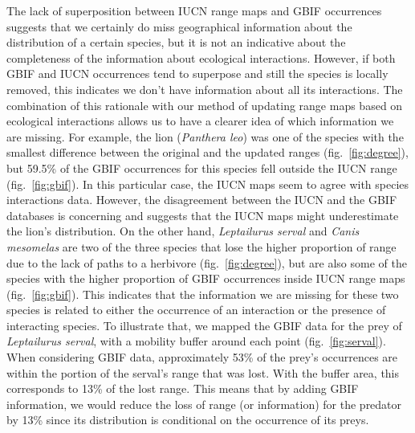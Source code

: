 \documentclass[10pt,oneside]{article}
\begin{document}
The lack of superposition between IUCN range maps and GBIF occurrences
suggests that we certainly do miss geographical information about the
distribution of a certain species, but it is not an indicative about the
completeness of the information about ecological interactions. However,
if both GBIF and IUCN occurrences tend to superpose and still the
species is locally removed, this indicates we don't have information
about all its interactions. The combination of this rationale with our
method of updating range maps based on ecological interactions allows us
to have a clearer idea of which information we are missing. For example,
the lion (\emph{Panthera leo}) was one of the species with the smallest
difference between the original and the updated ranges
(fig.~\ref{fig:degree}), but 59.5\% of the GBIF occurrences for this
species fell outside the IUCN range (fig.~\ref{fig:gbif}). In this
particular case, the IUCN maps seem to agree with species interactions
data. However, the disagreement between the IUCN and the GBIF databases
is concerning and suggests that the IUCN maps might underestimate the
lion's distribution. On the other hand, \emph{Leptailurus serval} and
\emph{Canis mesomelas} are two of the three species that lose the higher
proportion of range due to the lack of paths to a herbivore
(fig.~\ref{fig:degree}), but are also some of the species with the
higher proportion of GBIF occurrences inside IUCN range maps
(fig.~\ref{fig:gbif}). This indicates that the information we are
missing for these two species is related to either the occurrence of an
interaction or the presence of interacting species. To illustrate that,
we mapped the GBIF data for the prey of \emph{Leptailurus serval}, with
a mobility buffer around each point (fig.~\ref{fig:serval}). When
considering GBIF data, approximately 53\% of the prey's occurrences are
within the portion of the serval's range that was lost. With the buffer
area, this corresponds to 13\% of the lost range. This means that by
adding GBIF information, we would reduce the loss of range (or
information) for the predator by 13\% since its distribution is
conditional on the occurrence of its preys.
\end{document}
